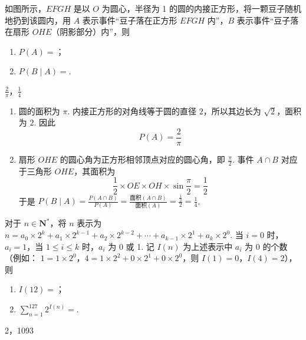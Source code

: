 \begin{problem}
如图所示，\(EFGH\) 是以 \(O\) 为圆心，半径为 1 的圆的内接正方形，将一颗豆子随机地扔到该圆内，用 \(A\) 表示事件“豆子落在正方形 \(EFGH\) 内”，\(B\) 表示事件“豆子落在扇形 \(OHE\)（阴影部分）内”，则
\begin{enumerate}
\item \(P(A)=\)\fillinblank{}；
\item \(P(B\mid A)=\)\fillinblank{}.
\end{enumerate}

\end{problem}

\begin{answer}
\(\frac{2}{\pi}\)，\(\frac{1}{4}\)
\end{answer}

\begin{solution}
\begin{enumerate}
\item
圆的面积为 \(\pi\). 内接正方形的对角线等于圆的直径 \(2\)，所以其边长为 \(\sqrt2\)，面积为 \(2\). 因此
\[
P(A)=\frac{2}{\pi}
\]

\item
扇形 \(OHE\) 的圆心角为正方形相邻顶点对应的圆心角，即 \(\frac{\pi}{2}\). 事件 \(A\cap B\) 对应于三角形 \(OHE\)，其面积为
\[
\frac12\times OE\times OH\times\sin\frac{\pi}{2}=\frac12
\]
于是 \(P(B\mid A)=\frac{P(A\cap B)}{P(A)}=\frac{\text{面积}(A\cap B)}{\text{面积}(A)}=\frac{\frac{1}{2}}{2}=\frac14\).
\end{enumerate}
\end{solution}

\begin{problem}
对于 \(n \in \mathbf{N}^*\)，将 \(n\) 表示为 \(n = a_0 \times 2^k + a_1 \times 2^{k-1} + a_2 \times 2^{k-2} + \cdots + a_{k-1} \times 2^1 + a_k \times 2^0\). 当 \(i = 0\) 时，\(a_i = 1\)，当 \(1 \leqslant i \leqslant k\) 时，\(a_i\) 为 0 或 1. 记 \(I(n)\) 为上述表示中 \(a_i\) 为 0 的个数 （例如： \(1 = 1 \times 2^0\)，\(4 = 1 \times 2^2 + 0 \times 2^1 + 0 \times 2^0\)，则 \(I(1) = 0\)，\(I(4) = 2\)），则
\begin{enumerate}
    \item \(I(12) =\)\fillinblank{}；
    \item \(\displaystyle\sum_{n=1}^{127} 2^{I(n)}=\)\fillinblank{}.
\end{enumerate}
\end{problem}

\begin{answer}
2，1093
\end{answer}

